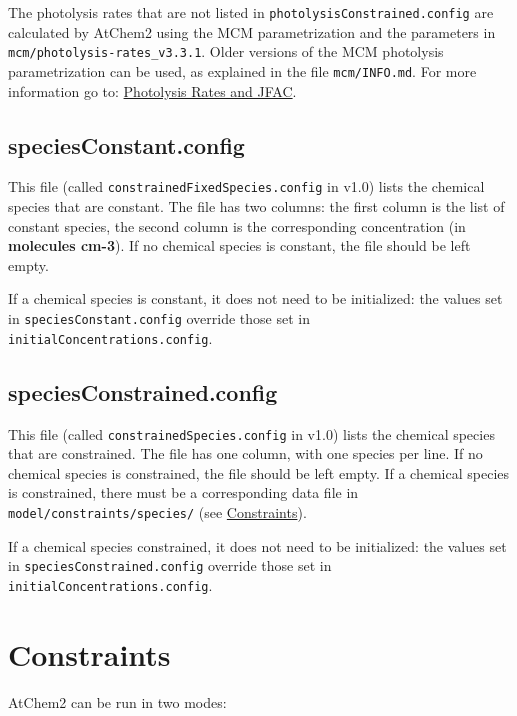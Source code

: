 The photolysis rates that are not listed in
\texttt{photolysisConstrained.config} are calculated by AtChem2 using
the MCM parametrization and the parameters in
\texttt{mcm/photolysis-rates\_v3.3.1}. Older versions of the MCM
photolysis parametrization can be used, as explained in the file
\texttt{mcm/INFO.md}. For more information go to:
\hyperref[sec:photolysis]{Photolysis Rates and JFAC}.

\subsection{speciesConstant.config} \label{subsec:speciesconstant}

This file (called \texttt{constrainedFixedSpecies.config} in v1.0)
lists the chemical species that are constant. The file has two
columns: the first column is the list of constant species, the second
column is the corresponding concentration (in \textbf{molecules
  cm-3}). If no chemical species is constant, the file should be left
empty.

If a chemical species is constant, it does not need to be initialized:
the values set in \texttt{speciesConstant.config} override those set
in \texttt{initialConcentrations.config}.

\subsection{speciesConstrained.config} \label{subsec:speciesconstrained}

This file (called \texttt{constrainedSpecies.config} in v1.0) lists
the chemical species that are constrained. The file has one column,
with one species per line. If no chemical species is constrained, the
file should be left empty. If a chemical species is constrained, there
must be a corresponding data file in
\texttt{model/constraints/species/} (see
\hyperref[sec:constraints]{Constraints}).

If a chemical species constrained, it does not need to be initialized:
the values set in \texttt{speciesConstrained.config} override those
set in \texttt{initialConcentrations.config}.

\section{Constraints} \label{sec:constraints}

AtChem2 can be run in two modes:

